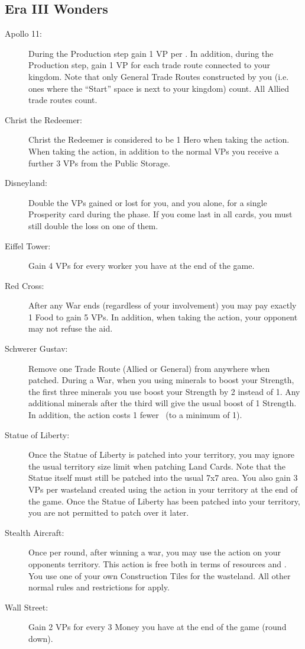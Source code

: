 \documentclass[10pt,twocolumn]{article}
\begin{document}
\begin{appendices}
\subsection{Era III Wonders}
\begin{description}
\item[Apollo 11:] During the Production step gain 1 VP per \tra. In addition, during the Production step, gain 1 VP for each trade route connected to your kingdom. Note that only General Trade Routes constructed by you (i.e. ones where the ``Start'' space is next to your kingdom) count. All Allied trade routes count.
\item[Christ the Redeemer:] Christ the Redeemer is considered to be 1 Hero when taking the  action. When taking the  action, in addition to the normal VPs you receive a further 3 VPs from the Public Storage.
\item[Disneyland:] Double the VPs gained or lost for you, and you alone, for a single Prosperity card during the  phase. If you come last in all cards, you must still double the loss on one of them.
\item[Eiffel Tower:] Gain 4 VPs for every worker you have at the end of the game.
\item[Red Cross:] After any War ends (regardless of your involvement) you may pay exactly 1 Food to gain 5 VPs. In addition, when taking the  action, your opponent may not refuse the aid.
\item[Schwerer Gustav:] Remove one Trade Route (Allied or General) from anywhere when patched. During a War, when you using minerals to boost your Strength, the first three minerals you use boost your Strength by 2 instead of 1. Any additional minerals after the third will give the usual boost of 1 Strength. In addition, the  action costs 1 fewer \polf\ (to a minimum of 1).
\item[Statue of Liberty:] Once the Statue of Liberty is patched into your territory, you may ignore the usual territory size limit when patching Land Cards. Note that the Statue itself must still be patched into the usual 7x7 area. You also gain 3 VPs per wasteland created using the  action in your territory at the end of the game. Once the Statue of Liberty has been patched into your territory, you are not permitted to patch over it later.
\item[Stealth Aircraft:] Once per round, after winning a war, you may use the  action on your opponents territory. This action is free both in terms of resources and \polf. You use one of your own Construction Tiles for the wasteland. All other normal rules and restrictions for  apply.
\item[Wall Street:] Gain 2 VPs for every 3 Money you have at the end of the game (round down).
\end{description}

\end{appendices}
\end{document}
